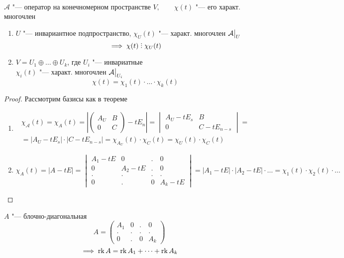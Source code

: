 \begin{implication}
    \hfill \\
	$ \mathcal{A} $ "--- оператор на конечномерном пространстве $ V, \qquad \chi(t) $ "--- его характ. многочлен
	\begin{enumerate}
		\item $ U $ "--- инвариантное подпространство, $ \chi_U(t) $ "--- характ. многочлен $ \mathcal{A}\big|_{U}^{} $
		$$ \implies \chi(t) \divby \chi_U(t) $$
		\item $ V = U_1 \oplus \dots \oplus U_k $, где $ U_i $ "--- инвариатные \\
		$ \chi_i(t) $ "--- характ. многочлен $ \mathcal{A}\big|_{U_i}^{} $
		$$ \chi(t) = \chi_1(t) \cdot \dots \cdot \chi_k(t) $$
	\end{enumerate}
\end{implication}

\begin{proof}
	Рассмотрим базисы как в теореме
	\begin{enumerate}
		\item
		\begin{multline*}
			\chi_{\mathcal{A}}(t) = \chi_A(t) = \left|
			\begin{pmatrix}
				A_U & B \\
				0 & C
			\end{pmatrix} - t E_n \right| =
			\begin{vmatrix}
				A_U - t E_s & B \\
				0 & C - t E_{n - s}
			\end{vmatrix} = \\
			= |A_U - t E_s | \cdot | C - t E_{n -s} | = \chi_{A_U}(t) \cdot \chi_C(t) = \chi_U(t) \cdot \chi_C(t)
		\end{multline*}
		\item $ \chi_A(t) = |A - tE| =
		\begin{vmatrix}
			A_1 - tE & 0 & . & 0 \\
			0 & A_2 - tE & . & 0 \\
			. & . & . & . \\
			0 & . & 0 & A_k - tE
		\end{vmatrix} = |A_1 - tE| \cdot |A_2 - tE| \cdot \dots = \chi_1(t) \cdot \chi_2(t) \cdot \dots $
	\end{enumerate}
\end{proof}

\begin{lemma}
	$ A $ "--- блочно-диагональная
	$$ A =
	\begin{pmatrix}
		A_1 & 0 & . & 0 \\
		. & . & . & . \\
		0 & . & 0 & A_k
	\end{pmatrix} $$
	$$ \implies \operatorname{rk} A = \operatorname{rk} A_1 + \dots + \operatorname{rk} A_k $$
\end{lemma}

